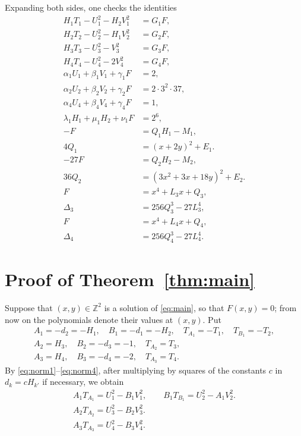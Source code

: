 \documentclass[11pt]{article}
\newcommand{\Z}{\mathbb{Z}}
\begin{document}
Expanding both sides, one checks the identities
\begin{align}
H_{1}T_{1}-U_{1}^2-H_{2}V_{1}^2&=G_{1}F,\label{eq:norm1}\\
H_{2}T_{2}-U_{2}^2-H_{1}V_{2}^2&=G_{2}F,\label{eq:norm2}\\
H_{3}T_{3}-U_{3}^2-V_{3}^2&=G_{3}F,\label{eq:norm3}\\
H_{4}T_{4}-U_{4}^2-2V_{4}^2&=G_{4}F,\label{eq:norm4}\\
\alpha_{1}U_{1}+\beta_{1}V_{1}+\gamma_{1}F&=2,\label{eq:bez1}\\
\alpha_{2}U_{2}+\beta_{2}V_{2}+\gamma_{2}F&=2\cdot 3^{2}\cdot 37,\label{eq:bez2}\\
\alpha_{4}U_{4}+\beta_{4}V_{4}+\gamma_{4}F&=1,\label{eq:bez4}\\
\lambda_{1}H_{1}+\mu_{1}H_{2}+\nu_{1}F&=2^{6},\label{eq:cross1}\\
-F&=Q_{1}H_{1}-M_{1},\label{eq:sign1}\\
4Q_{1}&=(x+2y)^2+E_{1}.\label{eq:sign1b}\\
-27F&=Q_{2}H_{2}-M_{2},\label{eq:sign2}\\
36Q_{2}&=(3x^{2}+3x+18y)^2+E_{2}.\label{eq:sign2b}\\
F&=x^4+L_{3}x+Q_{3},\label{eq:sign3}\\
\Delta_{3}&=256Q_{3}^3-27L_{3}^4,\label{eq:sign3b}\\
F&=x^4+L_{4}x+Q_{4},\label{eq:sign4}\\
\Delta_{4}&=256Q_{4}^3-27L_{4}^4.\label{eq:sign4b}
\end{align}

\section{Proof of Theorem~\ref{thm:main}}

Suppose that $(x,y)\in\Z^2$ is a solution of \eqref{eq:main}, so that $F(x,y)=0$; from now on the polynomials denote their values at $(x,y)$. Put
\begin{gather*}
A_{1}=-d_{2}=-H_{1},\quad B_{1}=-d_{1}=-H_{2},\quad T_{A_{1}}=-T_{1},\quad T_{B_{1}}=-T_{2},\\
A_{2}=H_{3},\quad B_{2}=-d_{3}=-1,\quad T_{A_{2}}=T_{3},\\
A_{3}=H_{4},\quad B_{3}=-d_{4}=-2,\quad T_{A_{3}}=T_{4}.
\end{gather*}
By \eqref{eq:norm1}--\eqref{eq:norm4}, after multiplying by squares of the constants $c$ in $d_k=cH_{k'}$ if necessary, we obtain
\begin{align}
A_{1}T_{A_{1}}=U_{1}^2-B_{1}V_{1}^2,\qquad B_{1}T_{B_{1}}=U_{2}^2-A_{1}V_{2}^2.\label{eq:AB1}\\
A_{2}T_{A_{2}}=U_{3}^2-B_{2} V_{3}^2.\label{eq:AB2}\\
A_{3}T_{A_{3}}=U_{4}^2-B_{3} V_{4}^2.\label{eq:AB3}
\end{align}
\end{document}
